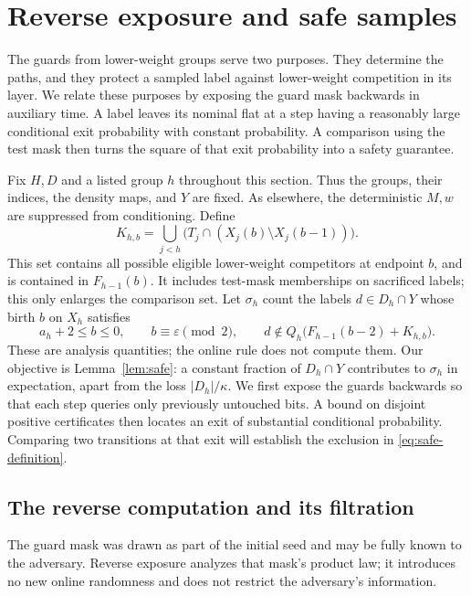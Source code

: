 \section{Reverse exposure and safe samples}\label{sec:safety}

The guards from lower-weight groups serve two purposes. They determine
the paths, and they protect a sampled label against lower-weight
competition in its layer. We relate these purposes by exposing the guard
mask backwards in auxiliary time. A label leaves its nominal flat at a
step having a reasonably large conditional exit probability with constant
probability. A comparison using the test mask then turns the square of
that exit probability into a safety guarantee.

Fix $H,D$ and a listed group $h$ throughout this section. Thus the groups,
their indices, the density maps, and $Y$ are fixed. As elsewhere, the
deterministic $M,w$ are suppressed from conditioning. Define
\begin{equation}\label{eq:competition-set}
 K_{h,b}=\bigcup_{j<h}
       \bigl(T_j\cap(X_j(b)\setminus X_j(b-1))\bigr).
\end{equation}
This set contains all possible eligible lower-weight competitors at
endpoint $b$, and is contained in $F_{h-1}(b)$. It includes test-mask
memberships on sacrificed labels; this only enlarges the comparison set.
Let $\sigma_h$ count the labels $d\in D_h\cap Y$ whose birth $b$ on $X_h$
satisfies
\begin{equation}\label{eq:safe-definition}
 a_h+2\le b\le0,\qquad b\equiv\varepsilon\pmod2,\qquad
 d\notin Q_h\bigl(F_{h-1}(b-2)+K_{h,b}\bigr).
\end{equation}
These are analysis quantities; the online rule does not compute them.
Our objective is Lemma~\ref{lem:safe}: a constant fraction of
$D_h\cap Y$ contributes to $\sigma_h$ in expectation, apart from the
loss $|D_h|/\kappa$. We first expose the guards backwards so that each
step queries only previously untouched bits. A bound on disjoint
positive certificates then locates an exit of substantial conditional
probability. Comparing two transitions at that exit will establish the
exclusion in \eqref{eq:safe-definition}.

\subsection{The reverse computation and its filtration}

The guard mask was drawn as part of the initial seed and may be fully known
to the adversary. Reverse exposure analyzes that mask's product law; it
introduces no new online randomness and does not restrict the adversary's
information.

